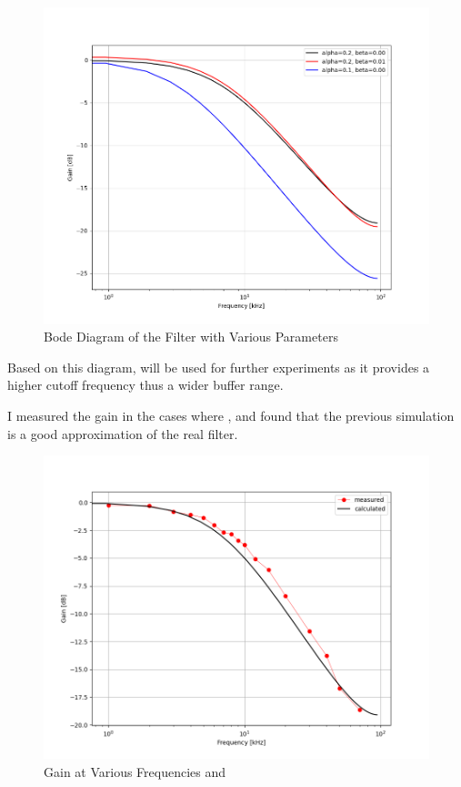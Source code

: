 \begin{figure}[H]
    \centering
    \includegraphics[width=150mm, keepaspectratio]{figures/bode.png}
    \caption{Bode Diagram of the Filter with Various Parameters}
    \label{fig:bode}
\end{figure}

Based on this diagram,  will be used for further experiments as it provides a higher cutoff frequency thus a wider buffer range.

I measured the gain in the cases where , and found that the previous simulation is a good approximation of the real filter.

\begin{figure}[H]
    \centering
    \includegraphics[width=150mm, keepaspectratio]{figures/bode02000.png}
    \caption{Gain at Various Frequencies  and }
    \label{fig:bode02000}
\end{figure}

